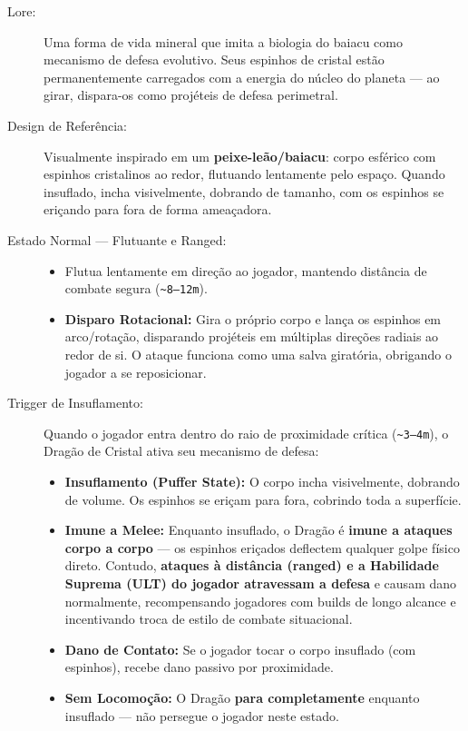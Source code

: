 \documentclass[a4paper,12pt]{report}
\begin{document}
\begin{description}
    \item[Lore:] Uma forma de vida mineral que imita a biologia do baiacu como mecanismo de defesa evolutivo. Seus espinhos de cristal estão permanentemente carregados com a energia do núcleo do planeta — ao girar, dispara-os como projéteis de defesa perimetral.
    \item[Design de Referência:] Visualmente inspirado em um \textbf{peixe-leão/baiacu}: corpo esférico com espinhos cristalinos ao redor, flutuando lentamente pelo espaço. Quando insuflado, incha visivelmente, dobrando de tamanho, com os espinhos se eriçando para fora de forma ameaçadora.
    \item[Estado Normal --- Flutuante e Ranged:]
    \begin{itemize}
        \item Flutua lentamente em direção ao jogador, mantendo distância de combate segura (\texttt{\~{}8--12m}).
        \item \textbf{Disparo Rotacional:} Gira o próprio corpo e lança os espinhos em arco/rotação, disparando projéteis em múltiplas direções radiais ao redor de si. O ataque funciona como uma salva giratória, obrigando o jogador a se reposicionar.
    \end{itemize}
    \item[Trigger de Insuflamento:]
    Quando o jogador entra dentro do raio de proximidade crítica (\texttt{\~{}3--4m}), o Dragão de Cristal ativa seu mecanismo de defesa:
    \begin{itemize}
        \item \textbf{Insuflamento (Puffer State):} O corpo incha visivelmente, dobrando de volume. Os espinhos se eriçam para fora, cobrindo toda a superfície.
        \item \textbf{Imune a Melee:} Enquanto insuflado, o Dragão é \textbf{imune a ataques corpo a corpo} --- os espinhos eriçados deflectem qualquer golpe físico direto. Contudo, \textbf{ataques à distância (ranged) e a Habilidade Suprema (ULT) do jogador atravessam a defesa} e causam dano normalmente, recompensando jogadores com builds de longo alcance e incentivando troca de estilo de combate situacional.
        \item \textbf{Dano de Contato:} Se o jogador tocar o corpo insuflado (com espinhos), recebe dano passivo por proximidade.
        \item \textbf{Sem Locomoção:} O Dragão \textbf{para completamente} enquanto insuflado --- não persegue o jogador neste estado.

\end{itemize}
\end{description}
\end{document}
